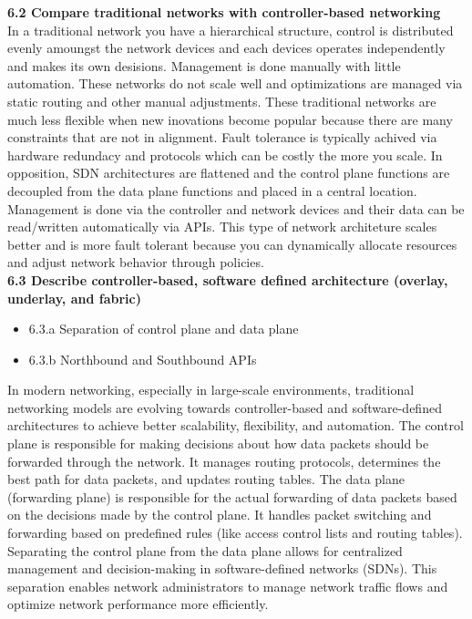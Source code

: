 \documentclass{article}
\begin{document}
\textbf{6.2 Compare traditional networks with controller-based networking}\\

	In a traditional network you have a hierarchical structure, control is distributed evenly amoungst the network devices and each devices operates independently and makes its own desisions. Management is done manually with little automation. These networks do not scale well and optimizations are managed via static routing and other manual adjustments. These traditional networks are much less flexible when new inovations become popular because there are many constraints that are not in alignment. Fault tolerance is typically achived via hardware redundacy and protocols which can be costly the more you scale. In opposition, SDN architectures are flattened and the control plane functions are decoupled from the data plane functions and placed in a central location. Management is done via the controller and network devices and their data can be read/written automatically via APIs. This type of network architeture scales better and is more fault tolerant because you can dynamically allocate resources and adjust network behavior through policies.\\
  
\noindent\textbf{6.3 Describe controller-based, software defined architecture (overlay, underlay, and fabric)}
\begin{itemize}
\item 6.3.a Separation of control plane and data plane
\item 6.3.b Northbound and Southbound APIs
\end{itemize}

	In modern networking, especially in large-scale environments, traditional networking models are evolving towards controller-based and software-defined architectures to achieve better scalability, flexibility, and automation. The control plane is responsible for making decisions about how data packets should be forwarded through the network. It manages routing protocols, determines the best path for data packets, and updates routing tables. The data plane (forwarding plane) is responsible for the actual forwarding of data packets based on the decisions made by the control plane. It handles packet switching and forwarding based on predefined rules (like access control lists and routing tables). Separating the control plane from the data plane allows for centralized management and decision-making in software-defined networks (SDNs). This separation enables network administrators to manage network traffic flows and optimize network performance more efficiently.\\
	
\end{document}

